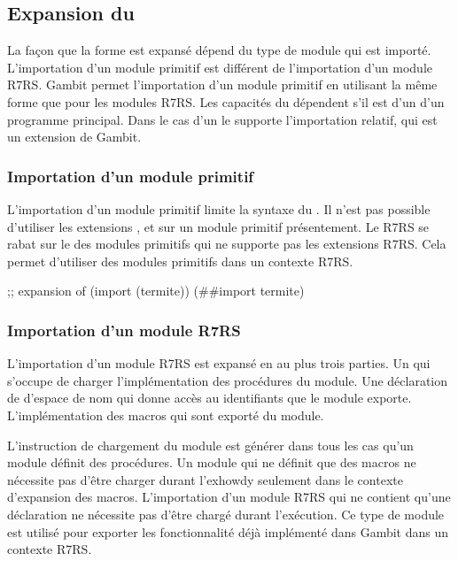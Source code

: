 \subsection{Expansion du }
\label{sec:import-expand}

La façon que la forme  est expansé dépend du type de module qui
est importé. L'importation d'un module primitif est différent de l'importation
d'un module R7RS. Gambit permet l'importation d'un module primitif en utilisant
la même forme que pour les modules R7RS. Les capacités du 
dépendent s'il est d'un  d'un programme principal. Dans
le cas d'un  le  supporte l'importation
relatif, qui est un extension de Gambit.


\subsubsection{Importation d'un module primitif}
L'importation d'un module primitif limite la syntaxe du .
Il n'est pas possible d'utiliser les extensions , 
et  sur un module primitif présentement. Le  R7RS se rabat
sur le  des modules primitifs qui ne supporte pas les extensions R7RS.
Cela permet d'utiliser des modules primitifs dans un contexte R7RS.\\
\begin{center}
\begin{mplisting}{0.8}
;; expansion of (import (termite))
(##import termite)
\end{mplisting}
\end{center}

\subsubsection{Importation d'un module R7RS}

L'importation d'un module R7RS est expansé en au plus trois parties.  Un
 qui s'occupe de charger l'implémentation des
procédures du module. Une déclaration de d'espace de nom qui donne accès au
identifiants que le module exporte. L'implémentation des macros qui sont
exporté du module.

L'instruction de chargement du module est générer dans tous les cas qu'un
module définit des procédures. Un module qui ne définit que des macros ne
nécessite pas d'être charger durant l'exhowdy seulement dans le contexte
d'expansion des macros. L'importation d'un module R7RS qui ne contient qu'une
déclaration  ne nécessite pas d'être chargé durant l'exécution.
Ce type de module est utilisé pour exporter les fonctionnalité déjà implémenté
dans Gambit dans un contexte R7RS.

